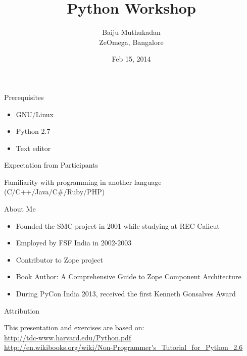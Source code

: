 \documentclass[12pt,handout]{beamer}
\title[Python Workshop]{Python Workshop}
\author{Baiju Muthukadan \\ ZeOmega, Bangalore}
\institute{FOSSMeet'14, NIT Calicut}
\date{Feb 15, 2014}
\begin{document}
\begin{frame}
\titlepage
\end{frame}


\begin{frame}{Prerequisites}
\begin{itemize}
\item GNU/Linux
\item Python 2.7
\item Text editor
\end{itemize}
\end{frame}

\begin{frame}{Expectation from Participants}

\center \Large{Familiarity with programming in another language (C/C++/Java/C\#/Ruby/PHP)}

\end{frame}

\begin{frame}{About Me}

\begin{itemize}
\item Founded the SMC project in 2001 while studying at REC Calicut
\item Employed by FSF India in 2002-2003
\item Contributor to Zope project
\item Book Author: A Comprehensive Guide to Zope Component Architecture
\item During PyCon India 2013, received the first Kenneth Gonsalves Award
\end{itemize}

\end{frame}

\begin{frame}{Attribution}

This presentation and exercises are based on:
\\[.5cm]
\url{http://tdc-www.harvard.edu/Python.pdf}
\\
\url{http://en.wikibooks.org/wiki/Non-Programmer's_Tutorial_for_Python_2.6}

\end{frame}
\end{document}
